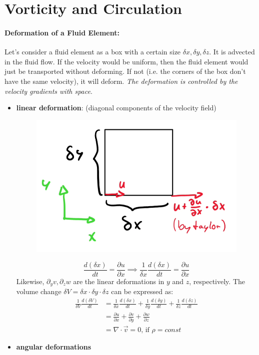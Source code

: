 \section{Vorticity and Circulation}
\paragraph{Deformation of a Fluid Element:} Let's consider a fluid element as a box with a certain size $\delta x, \delta y, \delta z$. It is advected in the fluid flow. If the velocity would be uniform, then the fluid element would just be transported without deforming. If not (i.e. the corners of the box don't have the same velocity), it will deform. \textit{The deformation is controlled by the velocity gradients with space}.

\begin{itemize}
	\setlength{\itemsep}{-5pt}
	\item \textbf{linear deformation}: (diagonal components of the velocity field)
	\begin{figure}[H]
		\centering
		\includegraphics[width=0.4\linewidth]{Sketches/LinearDeformation}
		\caption{}
		\label{fig:lineardeformation}
	\end{figure}
	\begin{equation*}
		\frac{d(\delta x)}{d t} = \frac{\partial u}{\partial x} \implies \frac{1}{\delta x} \frac{d (\delta x)}{d t} = \frac{\partial u}{\partial x}
	\end{equation*}
	Likewise, $\partial_y v, \partial_z w$ are the linear deformations in $y$ and $z$, respectively. The volume change $\delta V = \delta x\cdot \delta y \cdot \delta z $ can be expressed as:
	\begin{equation*}
	\begin{split}
		   \frac{1}{\delta V}\frac{d(\delta V)}{dt}  
		&= \frac{1}{\delta x}\frac{d(\delta x)}{dt} + \frac{1}{\delta y}\frac{d(\delta y)}{dt}+\frac{1}{\delta z}\frac{d(\delta z)}{dt} \\
		&= \frac{\partial u}{\partial x} + \frac{\partial v}{\partial y } + \frac{\partial w}{\partial z}\\
		&= \nabla \cdot \vec v = 0\text{, if $\rho=const$}
	\end{split}
	\end{equation*}
	\item \textbf{angular deformations}
\end{itemize}

